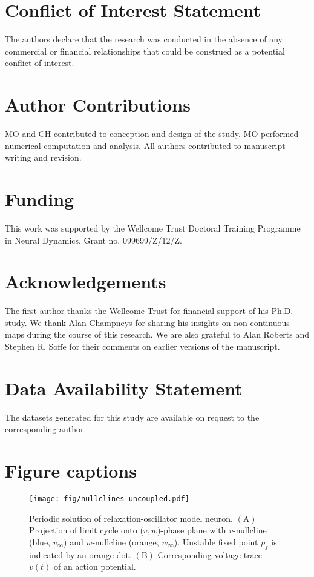 \documentclass[utf8, draft]{frontiersFPHY} %
\begin{document}





\section*{Conflict of Interest Statement}
The authors declare that the research was conducted in the absence of any commercial or
financial relationships that could be construed as a potential conflict of interest.

\section*{Author Contributions}
MO and CH contributed to conception and design of the study.
MO performed numerical computation and analysis.
All authors contributed to manuscript writing and revision.

\section*{Funding}
This work was supported by the Wellcome Trust Doctoral Training Programme in Neural
Dynamics, Grant no. 099699/Z/12/Z.

\section*{Acknowledgements}
The first author thanks the Wellcome Trust for financial support of his Ph.D. study.
We thank Alan Champneys for sharing his insights on non-continuous maps during the course of this research.
We are also grateful to Alan Roberts and Stephen R. Soffe for their comments on earlier versions of the manuscript.

\section*{Data Availability Statement}
The datasets generated for this study are available on request to the corresponding author.



\section*{Figure captions}

\begin{figure}[h!]
  \centering
  \texttt{[image: fig/nullclines-uncoupled.pdf]}
  \caption{Periodic solution of relaxation-oscillator model neuron. $\bm{\mathrm{(A)}}$
    Projection of limit cycle onto ($v,w$)-phase plane with $v$-nullcline (blue,
    $v_\infty$) and $w$-nullcline (orange, $w_\infty$). Unstable fixed point $p_{f}$
    is indicated by an orange dot. $\bm{\mathrm{(B)}}$ Corresponding voltage trace
    $v(t)$ of an action potential.~\label{fig:nullclines}}
\end{figure}
\end{document}
